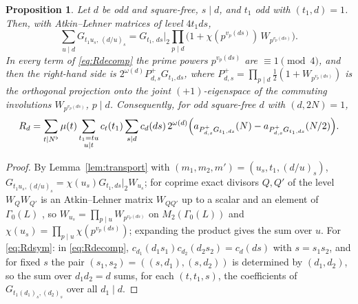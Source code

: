 ﻿\documentclass[11pt]{amsart}
\newtheorem{proposition}[theorem]{Proposition}
\theoremstyle{remark}
\begin{document}
\begin{proposition}\label{prop:symsum}
Let $d$ be odd and square-free, $s\mid d$, and $t_1$ odd with $(t_1,d)=1$. Then, with Atkin--Lehner matrices of level $4t_1ds$,
\[
\sum_{u\mid d}G_{t_1u_s,\,(d/u)_s}=G_{t_1,\,ds}\Big|_2\prod_{p\mid d}\bigl(1+\chi(p^{v_p(ds)})\,W_{p^{v_p(ds)}}\bigr).
\]
In every term of \eqref{eq:Rdecomp} the prime powers $p^{v_p(ds)}$ are $\equiv1\pmod4$, and then the right-hand side is $2^{\omega(d)}P^+_{d,s}G_{t_1,ds}$, where $P^+_{d,s}=\prod_{p\mid d}\frac12(1+W_{p^{v_p(ds)}})$ is the orthogonal projection onto the joint $(+1)$-eigenspace of the commuting involutions $W_{p^{v_p(ds)}}$, $p\mid d$. Consequently, for odd square-free $d$ with $(d,2N)=1$,
\begin{equation}\label{eq:Rdsym}
R_d=\sum_{t\mid N^\flat}\mu(t)\sum_{\substack{t_1=tu\\ u\mid t}}c_t(t_1)\sum_{s\mid d}c_d(ds)\,2^{\omega(d)}\Bigl(a_{P^+_{d,s}G_{t_1,ds}}(N)-a_{P^+_{d,s}G_{t_1,ds}}(N/2)\Bigr).
\end{equation}
\end{proposition}
\begin{proof}
By Lemma~\ref{lem:transport} with $(m_1,m_2,m')=(u_s,t_1,(d/u)_s)$, $G_{t_1u_s,(d/u)_s}=\chi(u_s)G_{t_1,ds}|_2W_{u_s}$; for coprime exact divisors $Q,Q'$ of the level $W_QW_{Q'}$ is an Atkin--Lehner matrix $W_{QQ'}$ up to a scalar and an element of $\Gamma_0(L)$ \cite{AL}, so $W_{u_s}=\prod_{p\mid u}W_{p^{v_p(ds)}}$ on $M_2(\Gamma_0(L))$ and $\chi(u_s)=\prod_{p\mid u}\chi(p^{v_p(ds)})$; expanding the product gives the sum over $u$. For \eqref{eq:Rdsym}: in \eqref{eq:Rdecomp}, $c_{d_1}(d_1s_1)c_{d_2}(d_2s_2)=c_d(ds)$ with $s=s_1s_2$, and for fixed $s$ the pair $(s_1,s_2)=((s,d_1),(s,d_2))$ is determined by $(d_1,d_2)$, so the sum over $d_1d_2=d$ sums, for each $(t,t_1,s)$, the coefficients of $G_{t_1(d_1)_s,(d_2)_s}$ over all $d_1\mid d$.
\end{proof}
\end{document}
